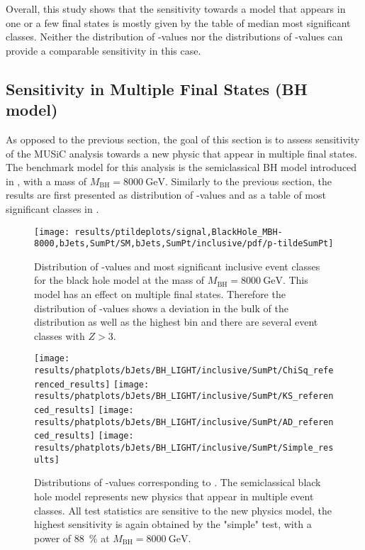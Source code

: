 Overall, this study shows that the sensitivity towards a model that appears in one or a few final states is mostly given by the table of median most significant classes. Neither the distribution of \ptilde-values nor the distributions of \TSphat-values can provide a comparable sensitivity in this case.

\subsection{Sensitivity in Multiple Final States (\ac{BH} model)}
As opposed to the previous section, the goal of this section is to assess sensitivity of the \ac{MUSiC} analysis towards a new physic that appear in multiple final states. The benchmark model for this analysis is the semiclassical \acl{BH} model introduced in , with a mass of $M_\text{BH} = \SI{8000}{\GeV}$.
Similarly to the previous section, the results are first presented as distribution of \ptilde-values and as a table of most significant classes in .

\begin{figure}[p]
    \centering
    \texttt{[image: results/ptildeplots/signal,BlackHole\_MBH-8000,bJets,SumPt/SM,bJets,SumPt/inclusive/pdf/p-tildeSumPt]}
    {
        \setlength{\tabcolsep}{1em}
        
    }
    \caption{Distribution of \ptilde-values and most significant inclusive event classes for the black hole model at the mass of $M_\text{BH} = \SI{8000}{\GeV}$. This model has an effect on multiple final states. Therefore the distribution of \ptilde-values shows a deviation in the bulk of the distribution as well as the highest bin and there are several event classes with $Z > \num{3}$.}
    \label{fig:multiple_final_states}
\end{figure}

\begin{figure}[p]
    \centering    \texttt{[image: results/phatplots/bJets/BH\_LIGHT/inclusive/SumPt/ChiSq\_referenced\_results]}
    \texttt{[image: results/phatplots/bJets/BH\_LIGHT/inclusive/SumPt/KS\_referenced\_results]}
    \texttt{[image: results/phatplots/bJets/BH\_LIGHT/inclusive/SumPt/AD\_referenced\_results]}
    \texttt{[image: results/phatplots/bJets/BH\_LIGHT/inclusive/SumPt/Simple\_results]}
    \caption{Distributions of \TSphat-values corresponding to . The semiclassical black hole model represents new physics that appear in multiple event classes. All test statistics are sensitive to the new physics model, the highest sensitivity is again obtained by the "simple" test, with a power of \SI{88}{\percent} at $M_\text{BH} = \SI{8000}{\GeV}$.}
    \label{fig:multiple_final_states_phat}
\end{figure}

